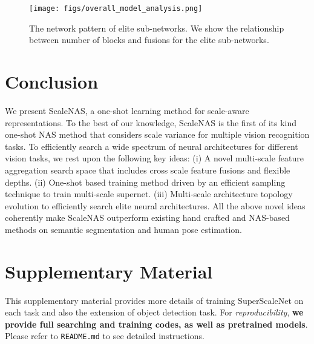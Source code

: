 \documentclass[final]{cvpr}
\newcommand{\workname}{ScaleNAS\xspace}
\newcommand{\supernet}{SuperScaleNet\xspace}
\begin{document}
\begin{figure}[t]
    \centering
    \texttt{[image: figs/overall\_model\_analysis.png]}
    \caption{The network pattern of elite sub-networks. We show the relationship between number of blocks and fusions for the elite sub-networks.}
    \label{fig:fusion_analysis}
\end{figure}
    
 \section{Conclusion}

We present \workname, a one-shot learning method for scale-aware representations.
To the best of our knowledge, \workname is the first of its kind one-shot NAS method that considers scale variance for multiple vision recognition tasks. 
To efficiently search a wide spectrum of neural architectures for different vision tasks, we rest upon the following key ideas:
(i) A novel multi-scale feature aggregation search space that 
includes cross scale feature fusions and flexible depths. 
(ii) One-shot based training method driven by an efficient sampling technique to train multi-scale supernet.
(iii) Multi-scale architecture topology evolution to efficiently search elite neural architectures. 
All the above novel ideas coherently make \workname outperform existing hand crafted and NAS-based methods on semantic segmentation and human pose estimation. 
 {\small


}

\section{Supplementary Material}
This supplementary material provides more details of training \supernet on each task and also the extension of object detection task. 
For \textit{reproducibility}, \textbf{we provide full searching and training codes, as well as pretrained models}. Please refer to \texttt{README.md} to see detailed instructions. 
\end{document}
